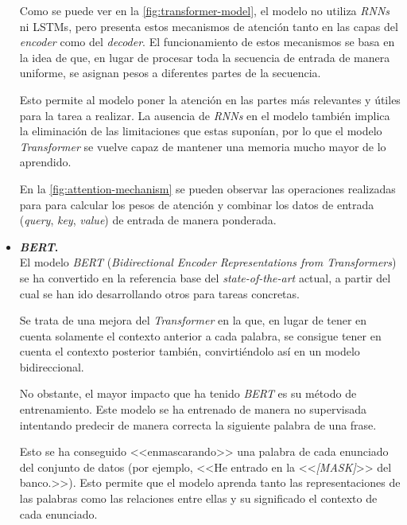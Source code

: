 \begin{itemize}
    
    Como se puede ver en la \autoref{fig:transformer-model}, el modelo no utiliza \textit{RNNs} ni {LSTMs}, pero presenta estos mecanismos de atención tanto en las capas del \textit{encoder} como del \textit{decoder}. El funcionamiento de estos mecanismos se basa en la idea de que, en lugar de procesar toda la secuencia de entrada de manera uniforme, se asignan pesos a diferentes partes de la secuencia.
    
    Esto permite al modelo poner la atención en las partes más relevantes y útiles para la tarea a realizar. La ausencia de \textit{RNNs} en el modelo también implica la eliminación de las limitaciones que estas suponían, por lo que el modelo \textit{Transformer} se vuelve capaz de mantener una memoria mucho mayor de lo aprendido. 
    
    En la \autoref{fig:attention-mechanism} se pueden observar las operaciones realizadas para para calcular los pesos de atención y combinar los datos de entrada (\textit{query}, \textit{key}, \textit{value}) de entrada de manera ponderada.


    \item \textbf{\textit{BERT}.}\\
    El modelo \textit{BERT} (\textit{Bidirectional Encoder Representations from Transformers}) se ha convertido en la referencia base del \textit{state-of-the-art} actual, a partir del cual se han ido desarrollando otros para tareas concretas.
    
    Se trata de una mejora del \textit{Transformer} en la que, en lugar de tener en cuenta solamente el contexto anterior a cada palabra, se consigue tener en cuenta el contexto posterior también, convirtiéndolo así en un modelo bidireccional.

    No obstante, el mayor impacto que ha tenido \textit{BERT} es su método de entrenamiento. Este modelo se ha entrenado de manera no supervisada intentando predecir de manera correcta la siguiente palabra de una frase. 
    
    Esto se ha conseguido <<enmascarando>> una palabra de cada enunciado del conjunto de datos (por ejemplo, <<He entrado en la <<\textit{[MASK]}>> del banco.>>). Esto permite que el modelo aprenda tanto las representaciones de las palabras como las relaciones entre ellas y su significado el contexto de cada enunciado.


\end{itemize}
